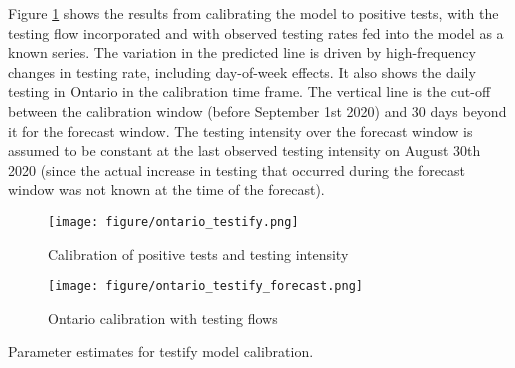 \documentclass[12pt]{article}\usepackage[]{graphicx}\usepackage[]{color}
\begin{document}
Figure \ref{fig:Ont_calibration_testify} shows the results from calibrating the model to positive tests, with the testing flow incorporated and with observed testing rates fed into the model as a known series.
The variation in the predicted line is driven by high-frequency changes in testing rate, including day-of-week effects.
It also shows the daily testing in Ontario in the calibration time frame. The vertical line is the cut-off between the calibration window (before September 1st 2020) and 30 days beyond it for the forecast window. The testing intensity over the forecast window is assumed to be constant at the last observed testing intensity on August 30th 2020 (since the actual increase in testing that occurred during the forecast window was not known at the time of the forecast).

\begin{figure}[ht!]
\texttt{[image: figure/ontario\_testify.png]}

\caption{Calibration of positive tests and testing intensity}
\label{fig:Ont_calibration_testify}
\end{figure}

\begin{figure}[ht!]
\texttt{[image: figure/ontario\_testify\_forecast.png]}

\caption{Ontario calibration with testing flows}
\label{fig:Ont_calibration_testify_forecast}
\end{figure}


\begin{table}
\centering

\caption{Parameter estimates for testify model calibration. 
}
\label{table:testify}

\end{table}
\end{document}

